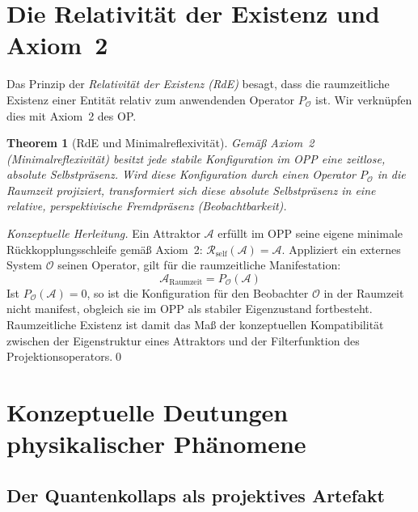 \documentclass[11pt,a4paper]{article}
\theoremstyle{plain}
\newtheorem{theorem}{Theorem}[section]
\theoremstyle{definition}
\begin{document}
\section{Die Relativit\"{a}t der Existenz und Axiom~2}

Das Prinzip der \emph{Relativit\"{a}t der Existenz (RdE)} besagt, dass die raumzeitliche
Existenz einer Entit\"{a}t relativ zum anwendenden Operator $P_{\mathcal{O}}$ ist. Wir
verkn\"{u}pfen dies mit Axiom~2 des OP.

\begin{theorem}[RdE und Minimalreflexivit\"{a}t]
Gem\"{a}\ss{} Axiom~2 (Minimalreflexivit\"{a}t) besitzt jede stabile Konfiguration im
OPP eine zeitlose, absolute \emph{Selbstpr\"{a}senz}. Wird diese Konfiguration durch
einen Operator $P_{\mathcal{O}}$ in die Raumzeit projiziert, transformiert sich diese
absolute Selbstpr\"{a}senz in eine relative, perspektivische \emph{Fremdpr\"{a}senz}
(Beobachtbarkeit).
\end{theorem}

\begin{proof}[Konzeptuelle Herleitung]
Ein Attraktor $\mathcal{A}$ erf\"{u}llt im OPP seine eigene minimale
R\"{u}ckkopplungsschleife gem\"{a}\ss{} Axiom~2: $\mathcal{R}_{\text{self}}(\mathcal{A})
= \mathcal{A}$. Appliziert ein externes System $\mathcal{O}$ seinen Operator, gilt f\"{u}r
die raumzeitliche Manifestation:
\[
  \mathcal{A}_{\text{Raumzeit}} = P_{\mathcal{O}}(\mathcal{A})
\]
Ist $P_{\mathcal{O}}(\mathcal{A}) = 0$, so ist die Konfiguration f\"{u}r den Beobachter
$\mathcal{O}$ in der Raumzeit nicht manifest, obgleich sie im OPP als stabiler
Eigenzustand fortbesteht. Raumzeitliche Existenz ist damit das Ma\ss{} der
konzeptuellen Kompatibilit\"{a}t zwischen der Eigenstruktur eines Attraktors und der
Filterfunktion des Projektionsoperators.\qed
\end{proof}

\section{Konzeptuelle Deutungen physikalischer Ph\"{a}nomene}

\subsection{Der Quantenkollaps als projektives Artefakt}
\end{document}
